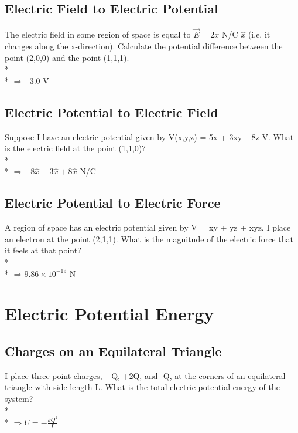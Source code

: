 \documentclass[11pt]{article}
\begin{document}
\subsection{Electric Field to Electric Potential}
The electric field in some region of space is equal to $\vec{E} = 2x$ N/C $\hat{x}$ (i.e. it changes along the x-direction).  Calculate the potential difference between the point (2,0,0) and the point (1,1,1).\\* \\*
$\Rightarrow$ -3.0 V

\subsection{Electric Potential to Electric Field}
Suppose I have an electric potential given by V(x,y,z) = 5x + 3xy – 8z V.  What is the electric field at the point (1,1,0)? \\* \\*
$\Rightarrow -8\hat{x} -3\hat{x} +8\hat{x}$ N/C

\pagebreak
\subsection{Electric Potential to Electric Force}
A region of space has an electric potential given by V = xy + yz + xyz.  I place an electron at the point (2,1,1).  What is the magnitude of the electric force that it feels at that point?\\* \\*
$\Rightarrow 9.86 \times 10^{-19}$ N


\pagebreak
\section{Electric Potential Energy}
\vspace{10pt}

\subsection{Charges on an Equilateral Triangle}
I place three point charges, +Q, +2Q, and -Q, at the corners of an equilateral triangle with side length L.  What is the total electric potential energy of the system?\\* \\*
$\Rightarrow U = -\frac{kQ^2}{L}$
\end{document}
